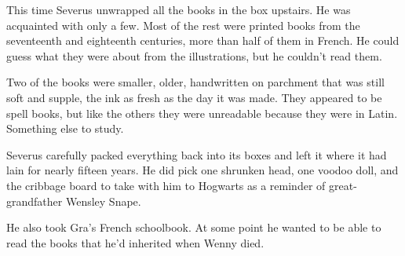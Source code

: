 \documentclass[a4paper,11pt]{article}
\begin{document}
This time Severus unwrapped all the books in the box upstairs. He was acquainted with only a few. Most of the rest were printed books from the seventeenth and eighteenth centuries, more than half of them in French. He could guess what they were about from the illustrations, but he couldn't read them.

Two of the books were smaller, older, handwritten on parchment that was still soft and supple, the ink as fresh as the day it was made. They appeared to be spell books, but like the others they were unreadable because they were in Latin. Something else to study.

Severus carefully packed everything back into its boxes and left it where it had lain for nearly fifteen years. He did pick one shrunken head, one voodoo doll, and the cribbage board to take with him to Hogwarts as a reminder of great-grandfather Wensley Snape.

He also took Gra's French schoolbook. At some point he wanted to be able to read the books that he'd inherited when Wenny died.
\end{document}
